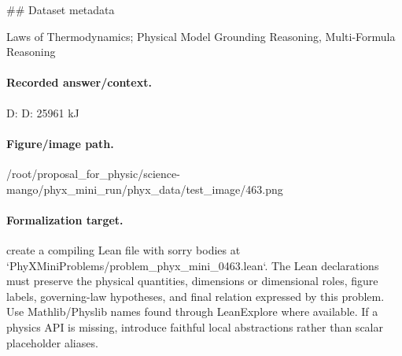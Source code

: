 \#\# Dataset metadata

Laws of Thermodynamics; Physical Model Grounding Reasoning, Multi-Formula Reasoning

\paragraph{Recorded answer/context.}
D: D: 25961 kJ

\paragraph{Figure/image path.}
/root/proposal\_for\_physic/science-mango/phyx\_mini\_run/phyx\_data/test\_image/463.png

\paragraph{Formalization target.}
create a compiling Lean file with sorry bodies at `PhyXMiniProblems/problem\_phyx\_mini\_0463.lean`. The Lean declarations must preserve the physical quantities, dimensions or dimensional roles, figure labels, governing-law hypotheses, and final relation expressed by this problem.
Use Mathlib/Physlib names found through LeanExplore where available. If a physics API is missing, introduce faithful local abstractions rather than scalar placeholder aliases.

